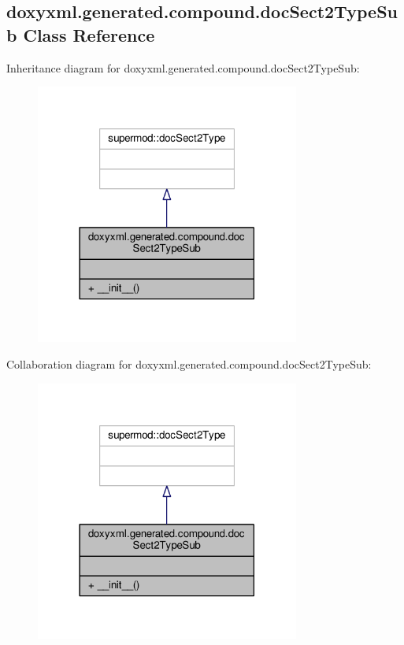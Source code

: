 \subsection{doxyxml.\+generated.\+compound.\+doc\+Sect2\+Type\+Sub Class Reference}
\label{classdoxyxml_1_1generated_1_1compound_1_1docSect2TypeSub}


Inheritance diagram for doxyxml.\+generated.\+compound.\+doc\+Sect2\+Type\+Sub\+:
\nopagebreak
\begin{figure}[H]
\begin{center}
\leavevmode
\includegraphics[width=246pt]{d0/dbb/classdoxyxml_1_1generated_1_1compound_1_1docSect2TypeSub__inherit__graph}
\end{center}
\end{figure}


Collaboration diagram for doxyxml.\+generated.\+compound.\+doc\+Sect2\+Type\+Sub\+:
\nopagebreak
\begin{figure}[H]
\begin{center}
\leavevmode
\includegraphics[width=246pt]{db/df1/classdoxyxml_1_1generated_1_1compound_1_1docSect2TypeSub__coll__graph}
\end{center}
\end{figure}
